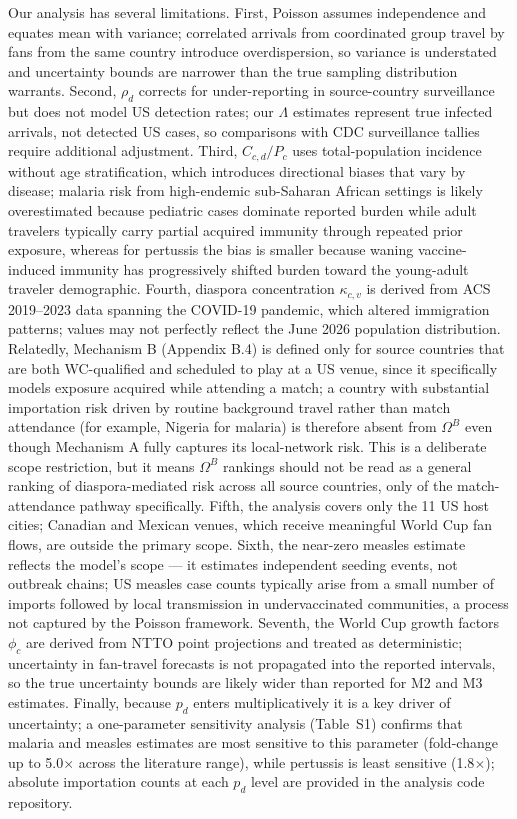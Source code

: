 \documentclass[12pt, a4paper]{article}
\begin{document}
Our analysis has several limitations. First, Poisson assumes independence and equates mean with variance; correlated arrivals from coordinated group travel by fans from the same country introduce overdispersion, so variance is understated and uncertainty bounds are narrower than the true sampling distribution warrants. Second, $\rho_d$ corrects for under-reporting in source-country surveillance but does not model US detection rates; our $\Lambda$ estimates represent true infected arrivals, not detected US cases, so comparisons with CDC surveillance tallies require additional adjustment. Third, $C_{c,d}/P_c$ uses total-population incidence without age stratification, which introduces directional biases that vary by disease; malaria risk from high-endemic sub-Saharan African settings is likely overestimated because pediatric cases dominate reported burden while adult travelers typically carry partial acquired immunity through repeated prior exposure, whereas for pertussis the bias is smaller because waning vaccine-induced immunity has progressively shifted burden toward the young-adult traveler demographic. Fourth, diaspora concentration $\kappa_{c,v}$ is derived from ACS 2019--2023 data spanning the COVID-19 pandemic, which altered immigration patterns; values may not perfectly reflect the June 2026 population distribution. Relatedly, Mechanism B (Appendix B.4) is defined only for source countries that are both WC-qualified and scheduled to play at a US venue, since it specifically models exposure acquired while attending a match; a country with substantial importation risk driven by routine background travel rather than match attendance (for example, Nigeria for malaria) is therefore absent from $\Omega^B$ even though Mechanism A fully captures its local-network risk. This is a deliberate scope restriction, but it means $\Omega^B$ rankings should not be read as a general ranking of diaspora-mediated risk across all source countries, only of the match-attendance pathway specifically. Fifth, the analysis covers only the 11 US host cities; Canadian and Mexican venues, which receive meaningful World Cup fan flows, are outside the primary scope. Sixth, the near-zero measles estimate reflects the model's scope --- it estimates independent seeding events, not outbreak chains; US measles case counts typically arise from a small number of imports followed by local transmission in undervaccinated communities, a process not captured by the Poisson framework. Seventh, the World Cup growth factors $\phi_c$ are derived from NTTO point projections and treated as deterministic; uncertainty in fan-travel forecasts is not propagated into the reported intervals, so the true uncertainty bounds are likely wider than reported for M2 and M3 estimates. Finally, because $p_d$ enters multiplicatively it is a key driver of uncertainty; a one-parameter sensitivity analysis (Table~S1) confirms that malaria and measles estimates are most sensitive to this parameter (fold-change up to 5.0$\times$ across the literature range), while pertussis is least sensitive (1.8$\times$); absolute importation counts at each $p_d$ level are provided in the analysis code repository.
\end{document}
